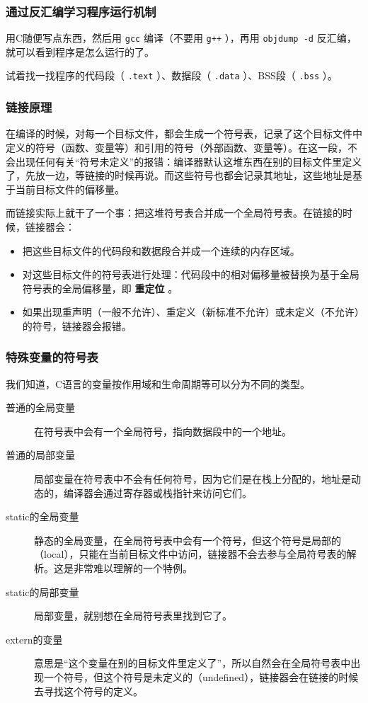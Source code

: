 \documentclass[fontset=none,aspectratio=1610]{ctexbeamer}
\begin{document}
\begin{frame}
    \frametitle{通过反汇编学习程序运行机制}

    用C随便写点东西，然后用 \texttt{gcc} 编译（不要用 \texttt{g++} ），再用 \texttt{objdump -d} 反汇编，就可以看到程序是怎么运行的了。

    试着找一找程序的代码段（ \texttt{.text} ）、数据段（ \texttt{.data} ）、BSS段（ \texttt{.bss} ）。

\end{frame}

\begin{frame}
    \frametitle{链接原理}

    在编译的时候，对每一个目标文件，都会生成一个符号表，记录了这个目标文件中定义的符号（函数、变量等）和引用的符号（外部函数、变量等）。在这一段，不会出现任何有关“符号未定义”的报错：编译器默认这堆东西在别的目标文件里定义了，先放一边，等链接的时候再说。而这些符号也都会记录其地址，这些地址是基于当前目标文件的偏移量。

    而链接实际上就干了一个事：把这堆符号表合并成一个全局符号表。在链接的时候，链接器会：
    \begin{itemize}
        \item 把这些目标文件的代码段和数据段合并成一个连续的内存区域。
        \item 对这些目标文件的符号表进行处理：代码段中的相对偏移量被替换为基于全局符号表的全局偏移量，即 \textbf{重定位} 。
        \item 如果出现重声明（一般不允许）、重定义（新标准不允许）或未定义（不允许）的符号，链接器会报错。
    \end{itemize}

\end{frame}

\begin{frame}
    \frametitle{特殊变量的符号表}

    我们知道，C语言的变量按作用域和生命周期等可以分为不同的类型。

    \begin{description}
        \item[普通的全局变量] 在符号表中会有一个全局符号，指向数据段中的一个地址。
        \item[普通的局部变量] 局部变量在符号表中不会有任何符号，因为它们是在栈上分配的，地址是动态的，编译器会通过寄存器或栈指针来访问它们。
        \item[static的全局变量] 静态的全局变量，在全局符号表中会有一个符号，但这个符号是局部的（local），只能在当前目标文件中访问，链接器不会去参与全局符号表的解析。这是非常难以理解的一个特例。
        \item[static的局部变量] 局部变量，就别想在全局符号表里找到它了。
        \item[extern的变量] 意思是“这个变量在别的目标文件里定义了”，所以自然会在全局符号表中出现一个符号，但这个符号是未定义的（undefined），链接器会在链接的时候去寻找这个符号的定义。 
    \end{description}
    
\end{frame}
\end{document}
